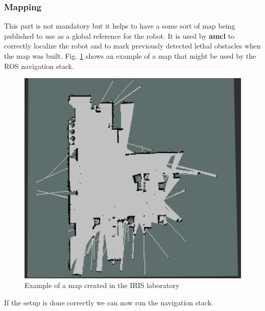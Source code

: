 \documentclass[12pt]{article}
\begin{document}
\subsubsection{Mapping}
This part is not mandatory but it helps to have a some sort of map being published to use as a global reference for the robot. It is used by \textbf{amcl} to correctly localize the robot and to mark previously detected lethal obstacles when the map was built. Fig. \ref{fig:map} shows an example of a map that might be used by the ROS navigation stack.
\begin{figure}[!htb]
    \centering
    \includegraphics[scale=0.3]{map.png}
    \caption{Example of a map created in the IRIS laboratory}
    \label{fig:map}
\end{figure}


If the setup is done correctly we can now run the navigation stack.
\end{document}
